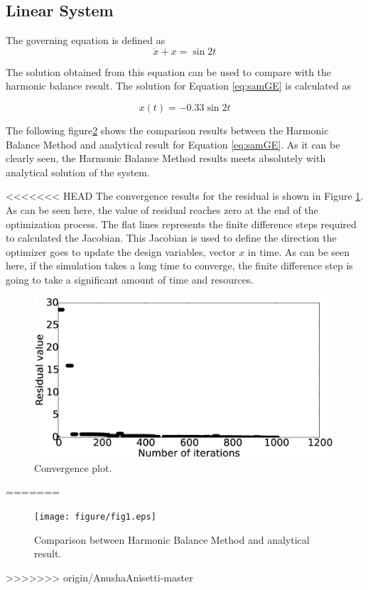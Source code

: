 \documentclass[12pt, a4paper]{extarticle}
\begin{document}
\subsection{Linear System}
The governing equation is defined as
\begin{equation}\label{eq:samGE}
	\ddot{x} + x = \sin 2t
\end{equation}
 
The solution obtained from this equation can be used to compare with  the harmonic balance result. The solution for Equation \eqref{eq:samGE} is calculated as

\begin{equation}
	x(t) = -0.33 \sin 2t
\end{equation}

The following figure\ref{fig:samR1} shows the comparison results between the Harmonic Balance Method and analytical result for Equation \eqref{eq:samGE}. As it can be clearly seen, the Harmonic Balance Method results meets absolutely with analytical solution of the system.

<<<<<<< HEAD
The convergence results for the residual is shown in Figure \ref{fig:R1_convergence}. As can be seen here, the value of residual reaches zero at the end of the optimization process. The flat lines represents the finite difference steps required to calculated the Jacobian. This Jacobian is used to define the direction the optimizer goes to update the design variables, vector $x$ in time. As can be seen here, if the simulation takes a long time to converge, the finite difference step is going to take a significant amount of time and resources.

\begin{figure}[h]
	\centering
	\includegraphics[height=6.00cm]{figure/convergence_study_31.eps}
	\caption{Convergence plot.}
	\label{fig:R1_convergence}
\end{figure}

=======
\begin{figure}[H]
	\centering
	\texttt{[image: figure/fig1.eps]}
    \caption{Comparison between Harmonic Balance Method and analytical result.}
    \label{fig:samR1}
\end{figure}
>>>>>>> origin/AnushaAnisetti-master
\end{document}
